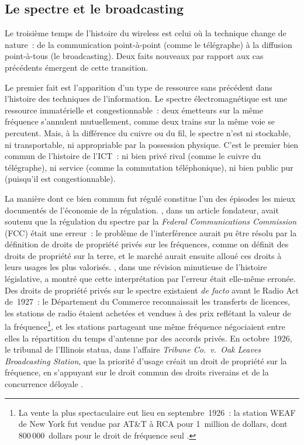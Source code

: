 \subsection{Le spectre et le broadcasting}\label{subsec:broadcasting}

Le troisième temps de l'histoire du wireless est celui où la technique change de nature~: de la communication point-à-point (comme le télégraphe) à la diffusion point-à-tous (le broadcasting). Deux faits nouveaux par rapport aux cas précédents émergent de cette transition.

%
Le premier fait est l'apparition d'un type de ressource sans précédent dans l'histoire des techniques de l'information. Le spectre électromagnétique est une ressource immatérielle et congestionnable~: deux émetteurs sur la même fréquence s'annulent mutuellement, comme deux trains sur la même voie se percutent. Mais, à la différence du cuivre ou du fil, le spectre n'est ni stockable, ni transportable, ni appropriable par la possession physique. C'est le premier bien commun de l'histoire de l'ICT~: ni bien privé rival (comme le cuivre du télégraphe), ni service (comme la commutation téléphonique), ni bien public pur (puisqu'il est congestionnable).

La manière dont ce bien commun fut régulé constitue l'un des épisodes les mieux documentés de l'économie de la régulation. \textcite{coase_federal_1959}, dans un article fondateur, avait soutenu que la régulation du spectre par la \emph{Federal Communications Commission} (FCC) était une erreur~: le problème de l'interférence aurait pu être résolu par la définition de droits de propriété privés sur les fréquences, comme on définit des droits de propriété sur la terre, et le marché aurait ensuite alloué ces droits à leurs usages les plus valorisés. \textcite{hazlett_rationality_1990}, dans une révision minutieuse de l'histoire législative, a montré que cette interprétation par l'erreur était elle-même erronée. Des droits de propriété privés sur le spectre existaient \emph{de facto} avant le Radio Act de~1927~: le Département du Commerce reconnaissait les transferts de licences, les stations de radio étaient achetées et vendues à des prix reflétant la valeur de la fréquence\footnote{La vente la plus spectaculaire eut lieu en septembre~1926~: la station WEAF de New York fut vendue par AT\&T à RCA pour 1~million de dollars, dont 800\,000~dollars pour le droit de fréquence seul \parencite{hazlett_rationality_1990}.}, et les stations partageant une même fréquence négociaient entre elles la répartition du temps d'antenne par des accords privés. En octobre~1926, le tribunal de l'Illinois statua, dans l'affaire \emph{Tribune Co.~v.~Oak Leaves Broadcasting Station}, que la priorité d'usage créait un droit de propriété sur la fréquence, en s'appuyant sur le droit commun des droits riverains et de la concurrence déloyale \parencite{hazlett_rationality_1990}.


